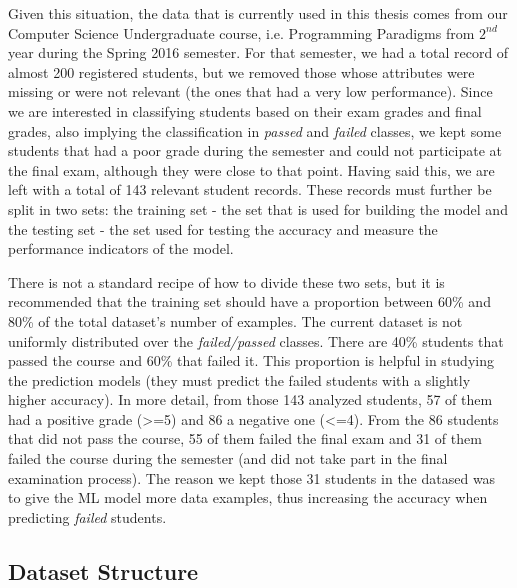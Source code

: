 Given this situation, the data that is currently used in this thesis comes from our Computer Science 
Undergraduate course, i.e. Programming Paradigms from $2^{nd}$ year during 
the Spring 2016 semester. For that semester, we had a total record of almost 200  
registered students, but we removed those whose attributes were missing or were not relevant 
(the ones that had a very low performance).
Since we are interested in classifying students based on their exam grades and final grades, 
also implying the classification in {\it passed} and {\it failed} classes, 
we kept some students that had a poor grade during the semester and 
could not participate at the final exam, although they were close to that point. 
Having said this, we are left with a total of 143 relevant student records. 
These records must further be split in two sets: the training set - the set 
that is used for building the model and the testing set - the set used for 
testing the accuracy and measure the performance indicators of the model. 

There is not a standard recipe of how to divide these two sets, but it is 
recommended that the training set should have a proportion between 60\% and 
80\% of the total dataset's number of examples. 
The current dataset is not uniformly distributed over the {\it failed/passed} 
classes. There are 40\% students that passed the course and 60\% that failed it.
This proportion is helpful in studying the prediction models (they must 
predict the failed students with a slightly higher accuracy). In more detail, 
from those 143 analyzed students, 57 of them had a positive grade (>=5) and 86 a 
negative one (<=4). From the 86 students that did not pass the course, 
55 of them failed the final exam and 31 of them failed the course during 
the semester (and did not take part in the final examination process). 
The reason we kept those 31 students in the datased was to give the ML 
model more data examples, thus increasing the accuracy when predicting 
{\it failed} students. 

\subsection{Dataset Structure}
\label{data_str}


